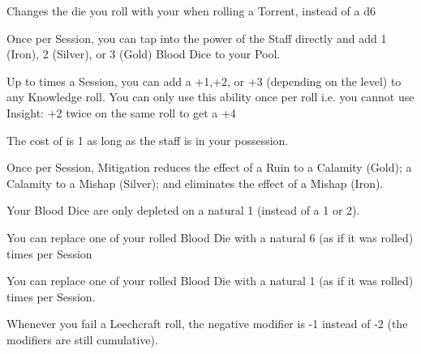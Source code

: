 {\cbreak


Changes the die you roll with your \INT when rolling a Torrent, instead of a d6


Once per Session, you can tap into the power of the Staff directly and add 1 (Iron), 2 (Silver), or 3 (Gold) Blood Dice to your Pool.


Up to \NUM times a Session, you can add a +1,+2, or +3 (depending on the level) to any Knowledge roll.  You can only use this ability once per roll i.e.  you cannot use Insight: +2 twice on the same roll to get a +4


The \TARGET cost of  is 1 as long as the staff is in your possession.



Once per Session, Mitigation reduces the effect of a Ruin to a Calamity (Gold); a Calamity to a Mishap (Silver); and eliminates the effect of a Mishap (Iron).


Your Blood Dice are only depleted on a natural 1 (instead of a 1 or 2). 



You can replace one of your rolled Blood Die with a natural 6 (as if it was rolled) \NUM times per Session  

 


You can replace one of your rolled Blood Die with a natural 1 (as if it was rolled) \NUM times per Session.


Whenever you fail a Leechcraft roll, the negative modifier is -1 instead of -2 (the modifiers are still cumulative).

\newpage




\newpage

}
